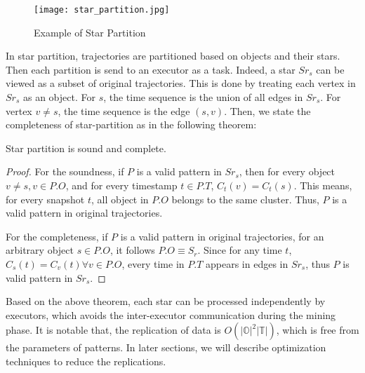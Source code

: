 \begin{figure}[h]
\centering
\texttt{[image: star\_partition.jpg]}
\caption{Example of Star Partition}
\label{fig:star_partition}
\end{figure}


In star partition, trajectories are partitioned based on objects and their stars. Then
each partition is send to an executor as a task. 
Indeed, a star $Sr_s$ can be viewed as a subset of original trajectories. This is done by treating each vertex in $Sr_s$ as an object. For $s$, the time sequence is the union of all edges in $Sr_s$. For vertex $v \neq s$, the time sequence is the edge $(s,v)$.
Then, we state the completeness of star-partition as in the following theorem:
\begin{theorem}
Star partition is sound and complete.
\end{theorem}

\begin{proof}
For the soundness,
if $P$ is a valid pattern in $Sr_s$, then for every object $v\neq s, v \in P.O$, and for every timestamp $t\in P.T$, $C_t(v) = C_t(s)$. This means, for every snapshot $t$, all object in $P.O$ belongs to the same cluster. Thus, $P$ is a valid pattern in original trajectories.

For the completeness,
if $P$ is a valid pattern in original trajectories, for an arbitrary object $s \in P.O$, it follows $P.O \equiv S_r$. Since for any time $t$, $C_s(t) = C_v(t) \forall v \in P.O$, every time in $P.T$ appears in edges in $Sr_s$, thus $P$ is valid pattern in $Sr_s$.
\end{proof}

Based on the above theorem, each star can be processed independently by executors, which avoids the inter-executor communication during the mining phase. It is notable that, the 
replication of data is $O(|\mathbb{O}|^2|\mathbb{T}|)$, which is free from the parameters of patterns.
In later sections, we will describe optimization techniques to reduce the replications.

